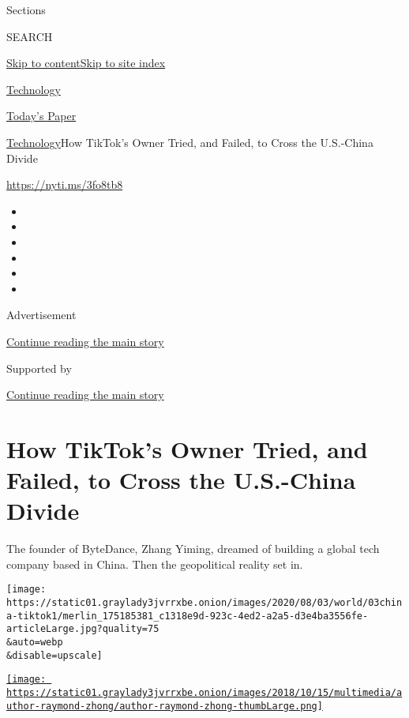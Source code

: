 Sections

SEARCH

\protect\hyperlink{site-content}{Skip to
content}\protect\hyperlink{site-index}{Skip to site index}

\href{https://www.nytimes3xbfgragh.onion/section/technology}{Technology}

\href{https://myaccount.nytimes3xbfgragh.onion/auth/login?response_type=cookie\&client_id=vi}{}

\href{https://www.nytimes3xbfgragh.onion/section/todayspaper}{Today's
Paper}

\href{/section/technology}{Technology}\textbar{}How TikTok's Owner
Tried, and Failed, to Cross the U.S.-China Divide

\url{https://nyti.ms/3fo8tb8}

\begin{itemize}
\item
\item
\item
\item
\item
\item
\end{itemize}

Advertisement

\protect\hyperlink{after-top}{Continue reading the main story}

Supported by

\protect\hyperlink{after-sponsor}{Continue reading the main story}

\hypertarget{how-tiktoks-owner-tried-and-failed-to-cross-the-us-china-divide}{%
\section{How TikTok's Owner Tried, and Failed, to Cross the U.S.-China
Divide}\label{how-tiktoks-owner-tried-and-failed-to-cross-the-us-china-divide}}

The founder of ByteDance, Zhang Yiming, dreamed of building a global
tech company based in China. Then the geopolitical reality set in.

\texttt{[image: https://static01.graylady3jvrrxbe.onion/images/2020/08/03/world/03china-tiktok1/merlin\_175185381\_c1318e9d-923c-4ed2-a2a5-d3e4ba3556fe-articleLarge.jpg?quality=75\\\&auto=webp\\\&disable=upscale]}

\href{https://www.nytimes3xbfgragh.onion/by/raymond-zhong}{\texttt{[image: https://static01.graylady3jvrrxbe.onion/images/2018/10/15/multimedia/author-raymond-zhong/author-raymond-zhong-thumbLarge.png]}}

